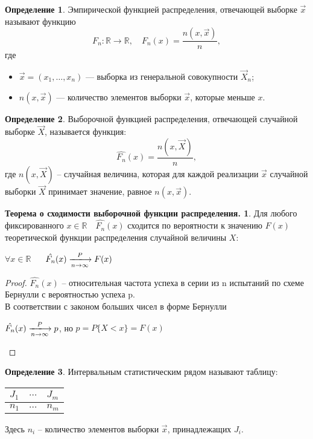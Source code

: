 \documentclass[a4paper, 12pt]{article}
\theoremstyle{definition}
\newtheorem{definition}{Определение}[section]
\theoremstyle{leads}
\theoremstyle{example}
\begin{document}
\begin{definition}
	Эмпирической функцией распределения, отвечающей выборке $\vec{x}$ называют функцию
	\begin{displaymath}
	F_n\colon \mathbb{R} \to \mathbb{R}, \quad F_n(x) = \frac{n(x, \vec{x})}{n}, 
	\end{displaymath}
	где 
	\begin{itemize}
		\item $\vec{x} = (x_1, \dots, x_n)$ --- выборка из генеральной совокупности $\vec{X}_n$;
		\item $n(x, \vec{x})$ --- количество элементов выборки $\vec{x}$, которые меньше $x$.
	\end{itemize}
\end{definition}
\begin{definition}
	Выборочной функцией распределения, отвечающей случайной выборке $\vec{X}$, называется функция:
	\begin{displaymath}
		\hat{F_n}(x) = \frac{n(x, \vec{X})}{n},  
	\end{displaymath}
	где $n(x, \vec{X})$ -- случайная величина, которая для каждой реализации $\vec{x}$ случайной выборки $\vec{X}$ принимает значение, равное $n(x, \vec{x})$. 
\end{definition}

\newtheorem*{sxod2}{Теорема о сходимости выборочной функции распределения.}
\begin{sxod2}
	Для любого фиксированного $x \in \mathbb{R} \quad \hat{F_n}(x)$ сходится по вероятности к значению $F(x)$ теоретической функции распределения случайной величины $X$:
	\begin{center}
		\centering
		$\forall x \in \mathbb{R}$ $\quad$ $\hat{F_n}(x) \xlongrightarrow[n \rightarrow \infty]{P} F(x)$
	\end{center}
\end{sxod2}
\begin{proof}
	$\hat{F_n}(x)$ -- относительная частота успеха в серии из n испытаний по схеме Бернулли с вероятностью успеха p.\\
	В соответствии с законом больших чисел в форме Бернулли  
	\begin{center}
		\centering
		$\hat{F_n}(x) \xlongrightarrow[n \rightarrow \infty]{P} p$, но $p = P\{X < x\} = F(x)$
	\end{center}
\end{proof}

\begin{definition}
	Интервальным статистическим рядом называют таблицу:
	\begin{center}
	\centering
	    \begin{tabular}{|l|l|l|}
		\hline
		$J_1$ & $\dots$ & $J_m$\\ \hline
		$n_1$ & $\dots$ & $n_m$\\ \hline 
	    \end{tabular}
    \end{center}
Здесь $n_i$ -- количество элементов выборки $\vec{x}$, принадлежащих $J_i$.
\end{definition}
\end{document}
